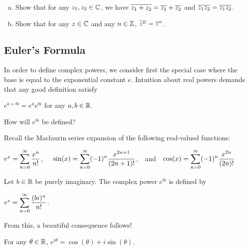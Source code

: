 \documentclass[11pt,fleqn,dvipsnames,usenames]{article}
\newcommand{\p}{\noindent}
\begin{document}
\exercises
\begin{enumerate}[(a)]
\item Show that for any $z_{1},z_{2}\in\mathbb{C}$, we have $\overline{z_{1} + z_{2}} = \overline{z_{1}} + \overline{z_{2}}$ and $\overline{z_{1}z_{2}} = \overline{z_{1}}\overline{z_{2}}$.
\item Show that for any $z\in\mathbb{C}$ and any $n\in\mathbb{Z}$, $\overline{z^{n}} = \overline{z}^{n}$.
\end{enumerate}

\subsection{Euler's Formula}

\begin{remark}\label{complexpowerexpectation}
In order to define complex powers, we consider first the special case where the base is equal to the exponential constant $e$.  Intuition about real powers demands that any good definition satisfy
\begin{center}
$e^{a+bi} = e^{a}e^{bi}$ for any $a,b\in\mathbb{R}$.
\end{center}
\end{remark}

\question How will $e^{bi}$ be defined?
\vsp

\p Recall the Maclaurin series expansion of the following real-valued functions:
\begin{center}
$e^{x} = \displaystyle\sum\limits_{n=0}^{\infty}\frac{x^{n}}{n!}$,\ \ \  $\sin(x) = \displaystyle\sum\limits_{n=0}^{\infty}(-1)^{n}\frac{x^{2n+1}}{(2n+1)!}$,\ \  and\ \  $\cos(x) = \displaystyle\sum\limits_{n=0}^{\infty}(-1)^{n}\frac{x^{2n}}{(2n)!}$
\end{center}
\vsp

\begin{definition}\label{purelyimaginarypowers}
Let $b\in\mathbb{R}$ be purely imaginary.  The complex power $e^{bi}$ is defined by
\begin{center}
$e^{z} = \displaystyle\sum\limits_{n=0}^{\infty}\frac{(bi)^{n}}{n!}$.
\end{center}
\end{definition}
\vsp

\p From this, a beautiful consequence follows!
\vsp

\begin{theorem}\label{eulersformula}
For any $\theta\in\mathbb{R}$, $e^{i\theta} = \cos(\theta) + i\sin(\theta)$.
\end{theorem}
\end{document}
